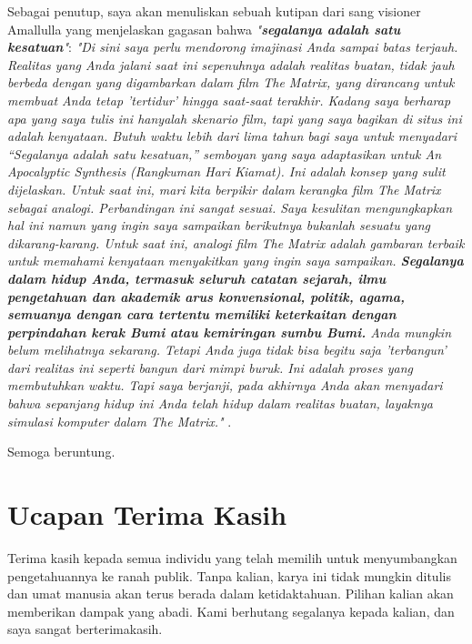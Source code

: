 \documentclass[10pt,twocolumn,letterpaper]{article}
\begin{document}
Sebagai penutup, saya akan menuliskan sebuah kutipan dari sang visioner Amallulla yang menjelaskan gagasan bahwa \textit{"\textbf{segalanya adalah satu kesatuan}"}: \textit{"Di sini saya perlu mendorong imajinasi Anda sampai batas terjauh. Realitas yang Anda jalani saat ini sepenuhnya adalah realitas buatan, tidak jauh berbeda dengan yang digambarkan dalam film The Matrix, yang dirancang untuk membuat Anda tetap 'tertidur' hingga saat-saat terakhir. Kadang saya berharap apa yang saya tulis ini hanyalah skenario film, tapi yang saya bagikan di situs ini adalah kenyataan. Butuh waktu lebih dari lima tahun bagi saya untuk menyadari “Segalanya adalah satu kesatuan,” semboyan yang saya adaptasikan untuk An Apocalyptic Synthesis (Rangkuman Hari Kiamat). Ini adalah konsep yang sulit dijelaskan. Untuk saat ini, mari kita berpikir dalam kerangka film The Matrix sebagai analogi. Perbandingan ini sangat sesuai. Saya kesulitan mengungkapkan hal ini namun yang ingin saya sampaikan berikutnya bukanlah sesuatu yang dikarang-karang. Untuk saat ini, analogi film The Matrix adalah gambaran terbaik untuk memahami kenyataan menyakitkan yang ingin saya sampaikan. \textbf{Segalanya dalam hidup Anda, termasuk seluruh catatan sejarah, ilmu pengetahuan dan akademik arus konvensional, politik, agama, semuanya dengan cara tertentu memiliki keterkaitan dengan perpindahan kerak Bumi atau kemiringan sumbu Bumi.} Anda mungkin belum melihatnya sekarang. Tetapi Anda juga tidak bisa begitu saja 'terbangun' dari realitas ini seperti bangun dari mimpi buruk. Ini adalah proses yang membutuhkan waktu. Tapi saya berjanji, pada akhirnya Anda akan menyadari bahwa sepanjang hidup ini Anda telah hidup dalam realitas buatan, layaknya simulasi komputer dalam The Matrix."} \cite{33,34}.

Semoga beruntung.

\section{Ucapan Terima Kasih}

Terima kasih kepada semua individu yang telah memilih untuk menyumbangkan pengetahuannya ke ranah publik. Tanpa kalian, karya ini tidak mungkin ditulis dan umat manusia akan terus berada dalam ketidaktahuan. Pilihan kalian akan memberikan dampak yang abadi. Kami berhutang segalanya kepada kalian, dan saya sangat berterimakasih.

\clearpage
\twocolumn

{\small


}
\end{document}
